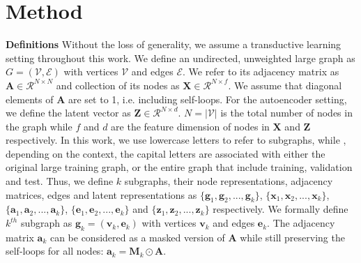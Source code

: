 \documentclass{article}
\begin{document}
\section{Method}

\textbf{Definitions} Without the loss of generality, we assume a transductive learning setting throughout this work. We define an undirected, unweighted large graph as $G = (\mathcal{V}, \mathcal{E})$ with vertices $\mathcal{V}$ and edges $\mathcal{E}$. We refer to its adjacency matrix as $\pmb{A} \in \mathcal{R}^{N \times N}$ and collection of its nodes as $\pmb{X} \in \mathcal{R}^{N \times f}$. We assume that diagonal elements of $\pmb{A}$ are set to 1, i.e. including self-loops. For the autoencoder setting, we define the latent vector as $\pmb{Z} \in \mathcal{R}^{N \times d}$. $N=|\mathcal{V}|$ is the total number of nodes in the graph while $f$ and $d$ are the feature dimension of nodes in $\pmb{X}$ and $\pmb{Z}$ respectively. In this work, we use lowercase letters to refer to subgraphs, while , depending on the context, the capital letters are associated with either the original large training graph, or the entire graph that include training, validation and test. Thus, we define $k$ subgraphs, their node representations, adjacency matrices, edges and latent representations as $\{\pmb{g}_1, \pmb{g}_2, ...,\pmb{g}_k\}$, $\{\pmb{x}_1, \pmb{x}_2, ...,\pmb{x}_k\}$, $\{\pmb{a}_1, \pmb{a}_2, ...,\pmb{a}_k\}$, $\{\pmb{e}_1, \pmb{e}_2, ...,\pmb{e}_k\}$ and  $\{\pmb{z}_1, \pmb{z}_2, ...,\pmb{z}_k\}$ respectively. We formally define $k^{th}$ subgraph as $\pmb{g}_k = (\pmb{v}_k, \pmb{e}_k)$ with vertices $\pmb{v}_k$ and edges $\pmb{e}_k$. The adjacency matrix $\pmb{a}_k$ can be considered as a masked version of $\pmb{A}$ while still preserving the self-loops for all nodes: $\pmb{a}_k = \pmb{M}_k \odot \pmb{A}$.
\end{document}
